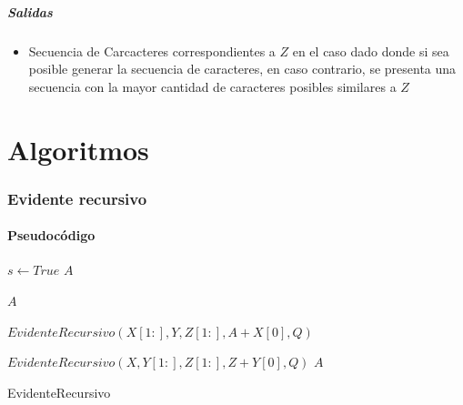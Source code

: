 \documentclass[]{article}
\numberwithin{equation}{section}
\numberwithin{figure}{section}
\theoremstyle{definition}
\begin{document}
\subsubsection*{Salidas}

\begin{itemize}

\item Secuencia de Carcacteres correspondientes a $Z$ en el caso dado donde si sea posible generar la secuencia de caracteres, en caso contrario, se presenta una secuencia con la mayor cantidad de caracteres posibles similares a $Z$

\end{itemize}

\part*{Algoritmos}

\section*{Evidente recursivo}
	
	\subsection*{Pseudocódigo}
	
	\begin{algorithm}[H]
	\begin{algorithmic}[1]


  			\State $s \leftarrow True$
  			\State\Return $A$
  		\EndIf
  		
  		
  				\State\Return $A$
  			\EndIf
  			
  						\State $EvidenteRecursivo(X[1:],Y,Z[1:],A+X[0],Q) $
  					\EndIf
  					
  				\EndIf
  						\State $EvidenteRecursivo(X,Y[1:],Z[1:],Z+Y[0],Q)$
  					\EndIf
  				\EndIf
  			\EndIf
  		\EndIf
  		\State\Return $A$

	\EndProcedure

	\end{algorithmic}
	\caption{\foreignlanguage{english}{EvidenteRecursivo}}
	\end{algorithm}
	
\end{document}
